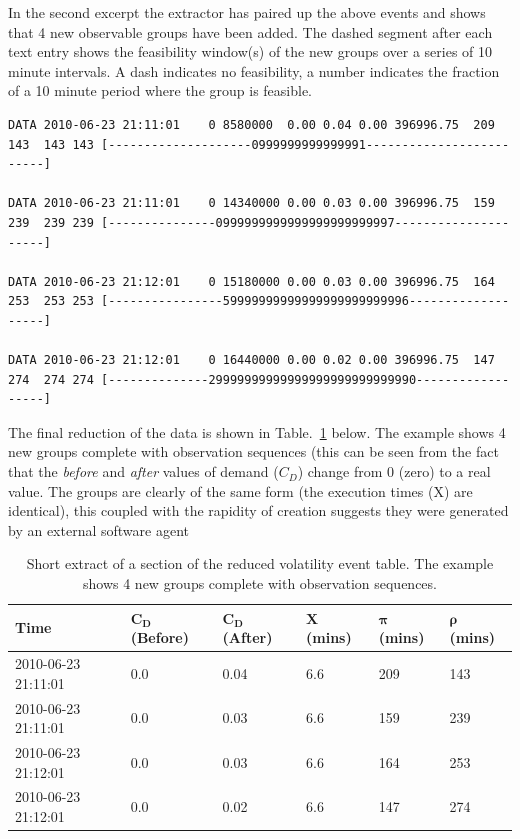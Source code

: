 
In the second excerpt the extractor has paired up the above events and shows that 4 new observable groups have been added. The dashed segment after each text entry shows the feasibility window(s) of the new groups over a series of 10 minute intervals. A dash indicates no feasibility, a number indicates the fraction of a 10 minute period where the group is feasible. 

\tiny
\begin{verbatim}
DATA 2010-06-23 21:11:01    0 8580000  0.00 0.04 0.00 396996.75  209  143  143 143 [--------------------0999999999999991-------------------------]

DATA 2010-06-23 21:11:01    0 14340000 0.00 0.03 0.00 396996.75  159  239  239 239 [---------------0999999999999999999999997---------------------]

DATA 2010-06-23 21:12:01    0 15180000 0.00 0.03 0.00 396996.75  164  253  253 253 [----------------59999999999999999999999996-------------------]

DATA 2010-06-23 21:12:01    0 16440000 0.00 0.02 0.00 396996.75  147  274  274 274 [--------------29999999999999999999999999990------------------]
\end{verbatim}
\normalsize

The final reduction of the data is shown in Table.~\ref{tab:volanal} below. The example shows 4 new groups complete with observation sequences (this can be seen from the fact that the \emph{before} and \emph{after} values of demand ($C_D$) change from 0 (zero) to a real value. The groups are clearly of the same form (the execution times (X) are identical), this coupled with the rapidity of creation suggests they were generated by an external software agent

\begin{table}[htbp]
\begin{center}
\begin{tabular}{|l|l|l|l|l|l|}
\hline
\bf{Time} &  $\mathbf{C_D}$ (Before) & $\mathbf{C_D}$ (After) & $\mathbf{X}$ (mins) & $\mathbf{\pi}$ (mins) & $\mathbf{\rho}$ (mins)   \\
\hline
2010-06-23 21:11:01  &  0.0  &  0.04  &  6.6  &  209  &  143 \\
2010-06-23 21:11:01  &  0.0  &  0.03  &  6.6  &  159  &  239 \\
2010-06-23 21:12:01  &  0.0  &  0.03  &  6.6  &  164  &  253 \\
2010-06-23 21:12:01  &  0.0  &  0.02  &  6.6  &  147  &  274 \\
\hline
\end{tabular}
\end{center}
\caption[Short extract of a section of the reduced volatility event table.]
{Short extract of a section of the reduced volatility event table.  The example shows 4 new groups complete with observation sequences.}
\label{tab:volanal}
\end{table}




